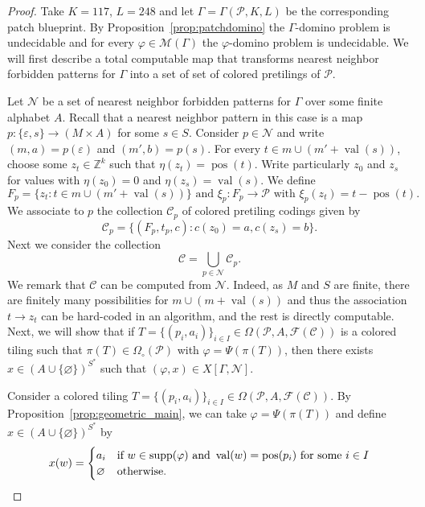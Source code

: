 \documentclass{article}
\theoremstyle{definition}
\theoremstyle{definition}
\newcommand{\ZZ}{\mathbb{Z}}
\newcommand{\M}{\mathcal{M}}
\newcommand{\PP}{\mathcal{P}}
\newcommand{\val}{\operatorname{val}}
\newcommand{\pos}{\operatorname{pos}}
\newcommand{\supp}{\textnormal{supp}}
\begin{document}
\begin{proof}
 Take $K = 117$, $L=248$ and let $\Gamma = \Gamma(\PP,K,L)$ be the corresponding patch blueprint. By Proposition~\ref{prop:patchdomino} the $\Gamma$-domino problem is undecidable and for every $\varphi \in \M(\Gamma)$ the $\varphi$-domino problem is undecidable. We will first describe a total computable map that transforms nearest neighbor forbidden patterns for $\Gamma$ into a set of set of colored pretilings of $\PP$.
 
 Let $\mathcal{N}$ be a set of nearest neighbor forbidden patterns for $\Gamma$ over some finite alphabet $A$. Recall that a nearest neighbor pattern in this case is a map $p \colon \{\varepsilon,s\} \to (M\times A)$ for some $s \in S$. Consider $p \in \mathcal{N}$ and write $(m,a)=p(\varepsilon)$ and $(m',b) = p(s)$. For every $t \in m \cup (m' + \val(s))$, choose some $z_t\in \ZZ^k$ such that $\eta(z_t) = \pos(t)$. Write particularly $z_0$ and $z_s$ for values with $\eta(z_0)=0$ and $\eta(z_{s})=\val(s)$. We define \[ F_p = \{ z_t : t \in m \cup (m' + \val(s))\} \mbox{ and } \xi_p \colon F_p \to \PP \mbox{ with } \xi_p(z_t) = t - \pos(t). \] 
We associate to $p$ the collection $\mathcal{C}_{p}$ of colored pretiling codings given by \[\mathcal{C}_p = \{ (F_p,t_p,c) :  c(z_0)=a, c(z_{s})=b\}.    \]
Next we consider the collection \[ \mathcal{C} = \bigcup_{p \in \mathcal{N}} \mathcal{C}_p.  \]
We remark that $\mathcal{C}$ can be computed from $\mathcal{N}$. Indeed, as $M$ and $S$ are finite, there are finitely many possibilities for $m\cup(m+\val(s))$ and thus the association $t \to z_t$ can be hard-coded in an algorithm, and the rest is directly computable. \\

Next, we will show that if $T = \{(p_i,a_i)\}_{i \in I}\in \Omega(\PP,A,\mathcal{F}(\mathcal{C}))$ is a colored tiling such that $\pi(T)\in \Omega_{\circ}(\PP)$ with $\varphi= \Psi(\pi(T))$, then there exists $x\in (A\cup\{\varnothing\})^{S^{*}}$ such that $(\varphi,x)\in X[\Gamma,\mathcal{N}]$. 

Consider a colored tiling $T = \{(p_i,a_i)\}_{i \in I}\in \Omega(\PP,A,\mathcal{F}(\mathcal{C}))$. By Proposition~\ref{prop:geometric_main}, we can take $\varphi = \Psi(\pi(T))$ and define $x\in (A\cup\{\varnothing\})^{S^{*}}$ by
 \[x(w) = \begin{cases}
     a_i & \textnormal{if } w \in \supp(\varphi) \mbox{ and } \val(w)=\pos(p_i) \mbox{ for some } i \in I \\
     \varnothing & \textnormal{otherwise.}
 \end{cases}\]


\end{proof}
\end{document}
